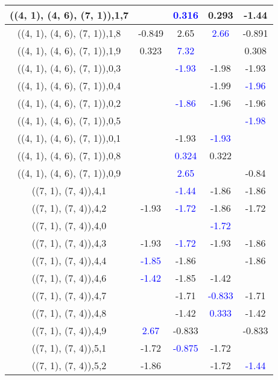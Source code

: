 \documentclass{article}
\begin{document}
\begin{center}
\begin{longtable}{|c|c|c|c|c|}
        	\hline
        	((4, 1), (4, 6), (7, 1)),1,7&& \textcolor{blue}{0.316}&0.293&-1.44\\
        	\hline
        	((4, 1), (4, 6), (7, 1)),1,8&-0.849&2.65& \textcolor{blue}{2.66}&-0.891\\
        	\hline
        	((4, 1), (4, 6), (7, 1)),1,9&0.323& \textcolor{blue}{7.32}&&0.308\\
        	\hline
        	((4, 1), (4, 6), (7, 1)),0,3&& \textcolor{blue}{-1.93}&-1.98&-1.93\\
        	\hline
        	((4, 1), (4, 6), (7, 1)),0,4&&&-1.99& \textcolor{blue}{-1.96}\\
        	\hline
        	((4, 1), (4, 6), (7, 1)),0,2&& \textcolor{blue}{-1.86}&-1.96&-1.96\\
        	\hline
        	((4, 1), (4, 6), (7, 1)),0,5&&&& \textcolor{blue}{-1.98}\\
        	\hline
        	((4, 1), (4, 6), (7, 1)),0,1&&-1.93& \textcolor{blue}{-1.93}&\\
        	\hline
        	((4, 1), (4, 6), (7, 1)),0,8&& \textcolor{blue}{0.324}&0.322&\\
        	\hline
        	((4, 1), (4, 6), (7, 1)),0,9&& \textcolor{blue}{2.65}&&-0.84\\
        	\hline
        	((7, 1), (7, 4)),4,1&& \textcolor{blue}{-1.44}&-1.86&-1.86\\
        	\hline
        	((7, 1), (7, 4)),4,2&-1.93& \textcolor{blue}{-1.72}&-1.86&-1.72\\
        	\hline
        	((7, 1), (7, 4)),4,0&&& \textcolor{blue}{-1.72}&\\
        	\hline
        	((7, 1), (7, 4)),4,3&-1.93& \textcolor{blue}{-1.72}&-1.93&-1.86\\
        	\hline
        	((7, 1), (7, 4)),4,4& \textcolor{blue}{-1.85}&-1.86&&-1.86\\
        	\hline
        	((7, 1), (7, 4)),4,6& \textcolor{blue}{-1.42}&-1.85&-1.42&\\
        	\hline
        	((7, 1), (7, 4)),4,7&&-1.71& \textcolor{blue}{-0.833}&-1.71\\
        	\hline
        	((7, 1), (7, 4)),4,8&&-1.42& \textcolor{blue}{0.333}&-1.42\\
        	\hline
        	((7, 1), (7, 4)),4,9& \textcolor{blue}{2.67}&-0.833&&-0.833\\
        	\hline
        	((7, 1), (7, 4)),5,1&-1.72& \textcolor{blue}{-0.875}&-1.72&\\
        	\hline
        	((7, 1), (7, 4)),5,2&-1.86&&-1.72& \textcolor{blue}{-1.44}\\

\end{longtable}
\end{center}
\end{document}
